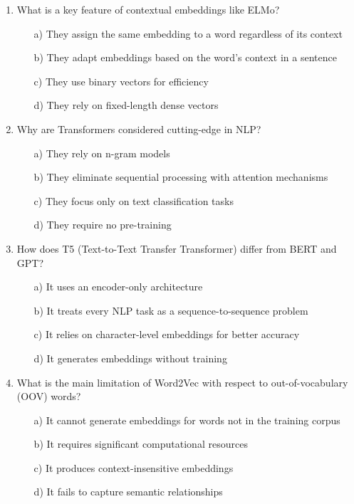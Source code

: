 \documentclass[8pt]{extarticle}
\begin{document}
\begin{multicols}{2}
\begin{enumerate}
\item What is a key feature of contextual embeddings like ELMo?
\begin{itemize}
\item[a)] They assign the same embedding to a word regardless of its context
\item[b)] They adapt embeddings based on the word's context in a sentence
\item[c)] They use binary vectors for efficiency
\item[d)] They rely on fixed-length dense vectors
\end{itemize}

\item Why are Transformers considered cutting-edge in NLP?
\begin{itemize}
\item[a)] They rely on n-gram models
\item[b)] They eliminate sequential processing with attention mechanisms
\item[c)] They focus only on text classification tasks
\item[d)] They require no pre-training
\end{itemize}

\item How does T5 (Text-to-Text Transfer Transformer) differ from BERT and GPT?
\begin{itemize}
\item[a)] It uses an encoder-only architecture
\item[b)] It treats every NLP task as a sequence-to-sequence problem
\item[c)] It relies on character-level embeddings for better accuracy
\item[d)] It generates embeddings without training
\end{itemize}

\item What is the main limitation of Word2Vec with respect to out-of-vocabulary (OOV) words?
\begin{itemize}
\item[a)] It cannot generate embeddings for words not in the training corpus
\item[b)] It requires significant computational resources
\item[c)] It produces context-insensitive embeddings
\item[d)] It fails to capture semantic relationships
\end{itemize}


\end{enumerate}
\end{multicols}
\end{document}
